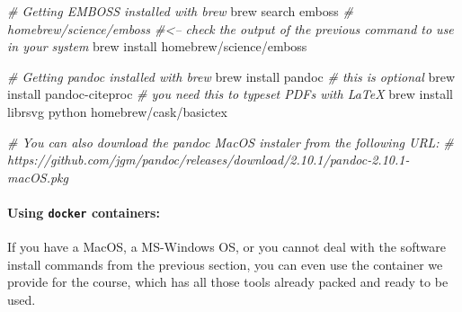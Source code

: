 \documentclass[10pt,a4paper,]{article}
\newenvironment{Shaded}{}{}
\newcommand{\CommentTok}[1]{\textcolor[rgb]{0.38,0.63,0.69}{\textit{#1}}}
\newcommand{\ExtensionTok}[1]{#1}
\newcommand{\NormalTok}[1]{#1}
\begin{document}
\begin{Shaded}
\begin{Highlighting}[]
\CommentTok{# Getting EMBOSS installed with brew}
\ExtensionTok{brew}\NormalTok{ search emboss}
\CommentTok{# homebrew/science/emboss  #<-- check the output of the previous command to use in your system}
\ExtensionTok{brew}\NormalTok{ install homebrew/science/emboss}

\CommentTok{# Getting pandoc installed with brew}
\ExtensionTok{brew}\NormalTok{ install pandoc}
\CommentTok{# this is optional}
\ExtensionTok{brew}\NormalTok{ install pandoc-citeproc}
\CommentTok{# you need this to typeset PDFs with LaTeX}
\ExtensionTok{brew}\NormalTok{ install librsvg python homebrew/cask/basictex}

\CommentTok{# You can also download the pandoc MacOS instaler from the following URL:}
\CommentTok{# https://github.com/jgm/pandoc/releases/download/2.10.1/pandoc-2.10.1-macOS.pkg}
\end{Highlighting}
\end{Shaded}

\hypertarget{using-docker-containers}{%
\paragraph{\texorpdfstring{Using \texttt{docker}
containers:}{Using docker containers:}}\label{using-docker-containers}}

If you have a MacOS, a MS-Windows OS, or you cannot deal with the
software install commands from the previous section, you can even use
the container we provide for the course, which has all those tools
already packed and ready to be used.
\end{document}
